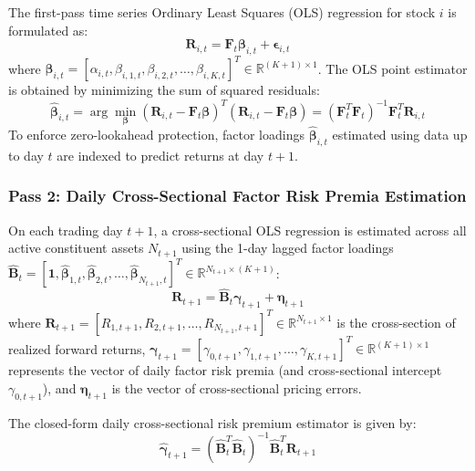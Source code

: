 The first-pass time series Ordinary Least Squares (OLS) regression for stock $i$ is formulated as:
\begin{equation}
\mathbf{R}_{i,t} = \mathbf{F}_t \boldsymbol{\beta}_{i,t} + \boldsymbol{\epsilon}_{i,t}
\label{eq:ch4_pass1_ols}
\end{equation}
where $\boldsymbol{\beta}_{i,t} = [\alpha_{i,t}, \beta_{i,1,t}, \beta_{i,2,t}, \dots, \beta_{i,K,t}]^T \in \mathbb{R}^{(K+1) \times 1}$. The OLS point estimator is obtained by minimizing the sum of squared residuals:
\begin{equation}
\hat{\boldsymbol{\beta}}_{i,t} = \arg\min_{\boldsymbol{\beta}} (\mathbf{R}_{i,t} - \mathbf{F}_t \boldsymbol{\beta})^T (\mathbf{R}_{i,t} - \mathbf{F}_t \boldsymbol{\beta}) = \left( \mathbf{F}_t^T \mathbf{F}_t \right)^{-1} \mathbf{F}_t^T \mathbf{R}_{i,t}
\label{eq:ch4_beta_hat}
\end{equation}
To enforce zero-lookahead protection, factor loadings $\hat{\boldsymbol{\beta}}_{i,t}$ estimated using data up to day $t$ are indexed to predict returns at day $t+1$.

\subsubsection{Pass 2: Daily Cross-Sectional Factor Risk Premia Estimation}
On each trading day $t+1$, a cross-sectional OLS regression is estimated across all active constituent assets $N_{t+1}$ using the 1-day lagged factor loadings $\hat{\mathbf{B}}_t = [\mathbf{1}, \hat{\boldsymbol{\beta}}_{1,t}, \hat{\boldsymbol{\beta}}_{2,t}, \dots, \hat{\boldsymbol{\beta}}_{N_{t+1},t}]^T \in \mathbb{R}^{N_{t+1} \times (K+1)}$:
\begin{equation}
\mathbf{R}_{t+1} = \hat{\mathbf{B}}_t \boldsymbol{\gamma}_{t+1} + \boldsymbol{\eta}_{t+1}
\label{eq:ch4_pass2_ols}
\end{equation}
where $\mathbf{R}_{t+1} = [R_{1,t+1}, R_{2,t+1}, \dots, R_{N_{t+1},t+1}]^T \in \mathbb{R}^{N_{t+1} \times 1}$ is the cross-section of realized forward returns, $\boldsymbol{\gamma}_{t+1} = [\gamma_{0,t+1}, \gamma_{1,t+1}, \dots, \gamma_{K,t+1}]^T \in \mathbb{R}^{(K+1) \times 1}$ represents the vector of daily factor risk premia (and cross-sectional intercept $\gamma_{0,t+1}$), and $\boldsymbol{\eta}_{t+1}$ is the vector of cross-sectional pricing errors.

The closed-form daily cross-sectional risk premium estimator is given by:
\begin{equation}
\hat{\boldsymbol{\gamma}}_{t+1} = \left( \hat{\mathbf{B}}_t^T \hat{\mathbf{B}}_t \right)^{-1} \hat{\mathbf{B}}_t^T \mathbf{R}_{t+1}
\label{eq:ch4_gamma_hat}
\end{equation}

